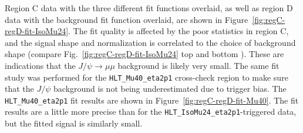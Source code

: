 Region C data with the three different fit functions overlaid, as well as region D data with the background fit function overlaid, are shown in Figure~\ref{fig:regC-regD-fit-IsoMu24}.  The fit quality is affected by the poor statistics in region C, and the signal shape and normalization is correlated to the choice of background shape (compare Fig.~\ref{fig:regC-regD-fit-IsoMu24} top \cmsRight and bottom \cmsLeft).  These are indications that the $J\slash\psi\rightarrow\mu\mu$ background is likely very small.  The same fit study was performed for the \texttt{HLT\_Mu40\_eta2p1} cross-check region to make sure that the $J\slash\psi$ background is not being underestimated due to trigger bias.  The \texttt{HLT\_Mu40\_eta2p1} fit results are shown in Figure~\ref{fig:regC-regD-fit-Mu40}.  The fit results are a little more precise than for the \texttt{HLT\_IsoMu24\_eta2p1}-triggered data, but the fitted signal is similarly small.

